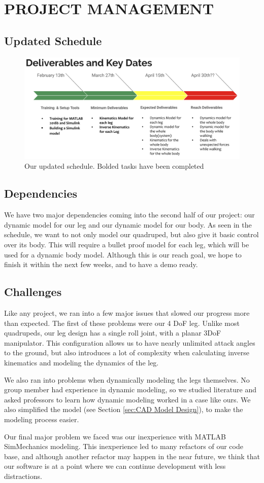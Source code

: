 \section{PROJECT MANAGEMENT}
\subsection{Updated Schedule}
    \begin{figure}[thpb]
        \parbox{\linewidth}{\includegraphics[width=\linewidth]{Figures/UpdatedSchedule.png}}
        \caption{Our updated schedule. Bolded tasks have been completed}
        \label{fig:updatedschedule}
    \end{figure}
\subsection{Dependencies}
We have two major dependencies coming into the second half of our project: our dynamic model for our leg and our dynamic model for our body. As seen in the schedule, we want to not only model our quadruped, but also give it basic control over its body. This will require a bullet proof model for each leg, which will be used for a dynamic body model. Although this is our reach goal, we hope to finish it within the next few weeks, and to have a demo ready.
\subsection{Challenges}
Like any project, we ran into a few major issues that slowed our progress more than expected. The first of these problems were our 4 DoF leg. Unlike most quadrupeds, our leg design has a single roll joint, with a planar 3DoF manipulator. This configuration allows us to have nearly unlimited attack angles to the ground, but also introduces a lot of complexity when calculating inverse kinematics and modeling the dynamics of the leg.

We also ran into problems when dynamically modeling the legs themselves. No group member had experience in dynamic modeling, so we studied literature and asked professors to learn how dynamic modeling worked in a case like ours. We also simplified the model (see Section \ref{sec:CAD Model Design}), to make the modeling process easier.

Our final major problem we faced was our inexperience with MATLAB SimMechanics modeling. This inexperience led to many refactors of our code base, and although another refactor may happen in the near future, we think that our software is at a point where we can continue development with less distractions.